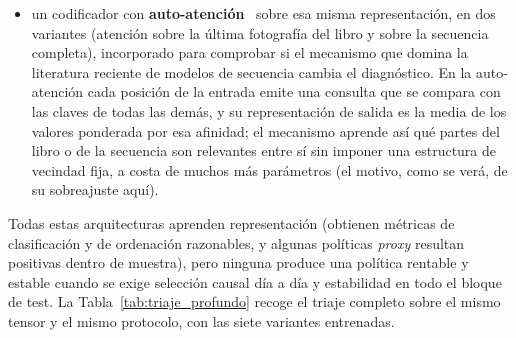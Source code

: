 \begin{itemize}[noitemsep]
y entrenar en paralelo, sin la dependencia secuencial de una recurrente;
\item un codificador con \textbf{auto-atención}~\cite{vaswani2017attention} sobre esa misma
representación, en dos variantes (atención sobre la última fotografía del libro y sobre la
secuencia completa), incorporado para comprobar si el mecanismo que domina la literatura
reciente de modelos de secuencia cambia el diagnóstico. En la auto-atención cada posición
de la entrada emite una consulta que se compara con las claves de todas las demás, y su
representación de salida es la media de los valores ponderada por esa afinidad; el
mecanismo aprende así qué partes del libro o de la secuencia son relevantes entre sí sin
imponer una estructura de vecindad fija, a costa de muchos más parámetros (el motivo, como
se verá, de su sobreajuste aquí).
\end{itemize}
Todas estas arquitecturas aprenden representación (obtienen métricas de clasificación y de
ordenación razonables, y algunas políticas \emph{proxy} resultan positivas dentro de
muestra), pero ninguna produce una política rentable y estable cuando se exige selección
causal día a día y estabilidad en todo el bloque de test. La
Tabla~\ref{tab:triaje_profundo} recoge el triaje completo sobre el mismo tensor y el mismo
protocolo, con las siete variantes entrenadas.

